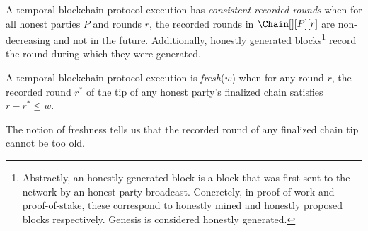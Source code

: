 \begin{definition}
  A temporal blockchain protocol execution has \emph{consistent recorded rounds}
  when for all honest parties $P$ and rounds $r$,
  the recorded rounds in $\Chain[][P][r]$ are non-decreasing and not
  in the future.
  Additionally, honestly generated blocks\footnote{
    Abstractly, an honestly generated block is a block that was first
    sent to the network by an honest party broadcast. Concretely, in proof-of-work
    and proof-of-stake, these correspond to honestly mined and honestly
    proposed blocks respectively. Genesis is considered honestly generated.
  } record the round during which
  they were generated.
\end{definition}

\begin{definition}[Freshness] \label{def:tip-freshness}
  A temporal blockchain protocol execution is \emph{fresh}($w$) when for
  any round $r$, the recorded round
  $r^*$ of the tip of any honest party's finalized chain
  satisfies $r - r^* \leq w$.
\end{definition}

The notion of freshness tells us that the recorded round
of any finalized chain tip cannot be too old.

